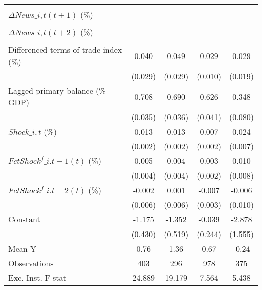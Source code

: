 {\begin{tabular}{l*{4}{c}}
                    &                     &                     &                     &                     \\
\addlinespace
$ \Delta News\_{i,t}(t+1)$ (\%)&                     &                     &                     &                     \\
                    &                     &                     &                     &                     \\
\addlinespace
$ \Delta News\_{i,t}(t+2)$ (\%)&                     &                     &                     &                     \\
                    &                     &                     &                     &                     \\
\addlinespace
Differenced terms-of-trade index (\%)&       0.040         &       0.049         &       0.029\sym{***}&       0.029         \\
                    &     (0.029)         &     (0.029)         &     (0.010)         &     (0.019)         \\
\addlinespace
Lagged primary balance (\% GDP)&       0.708\sym{***}&       0.690\sym{***}&       0.626\sym{***}&       0.348\sym{***}\\
                    &     (0.035)         &     (0.036)         &     (0.041)         &     (0.080)         \\
\addlinespace
$ Shock\_{i,t}$ (\%) &       0.013\sym{***}&       0.013\sym{***}&       0.007\sym{***}&       0.024\sym{***}\\
                    &     (0.002)         &     (0.002)         &     (0.002)         &     (0.007)         \\
\addlinespace
$ FctShock^f\_{i.t-1}(t)$ (\%)&       0.005         &       0.004         &       0.003         &       0.010         \\
                    &     (0.004)         &     (0.004)         &     (0.002)         &     (0.008)         \\
\addlinespace
$ FctShock^f\_{i.t-2}(t)$ (\%)&      -0.002         &       0.001         &      -0.007\sym{**} &      -0.006         \\
                    &     (0.006)         &     (0.006)         &     (0.003)         &     (0.010)         \\
\addlinespace
Constant            &      -1.175\sym{**} &      -1.352\sym{**} &      -0.039         &      -2.878\sym{*}  \\
                    &     (0.430)         &     (0.519)         &     (0.244)         &     (1.555)         \\
\midrule
Mean Y              &        0.76         &        1.36         &        0.67         &       -0.24         \\
Observations        &         403         &         296         &         978         &         375         \\
Exc. Inst. F-stat   &      24.889         &      19.179         &       7.564         &       5.438         \\
\bottomrule
\end{tabular}
}
